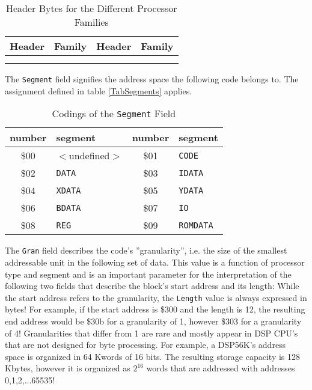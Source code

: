 \documentclass[12pt,twoside]{report}
\newcommand{\tty}[1]{{\tt #1}}
\begin{document}
\begin{center}\begin{longtable}{|c|l||c|l|}
\hline
Header  & Family & Header  & Family \\
\hline
\hline
\endhead

\\ \hline
\caption{Header Bytes for the Different Processor Families}
\label{TabHeader}
\end{longtable}\end{center}

The \tty{Segment} field signifies the address space the following code
belongs to.  The assignment defined in table \ref{TabSegments} applies.
\begin{table*}[htbp]
\begin{center}\begin{tabular}{|c|l||c|l|}
\hline
number  & segment               & number  & segment \\
\hline
\hline
\$00    & $<$undefined$>$       & \$01    & \tty{CODE} \\
\$02    & \tty{DATA}            & \$03    & \tty{IDATA} \\
\$04    & \tty{XDATA}           & \$05    & \tty{YDATA} \\
\$06    & \tty{BDATA}           & \$07    & \tty{IO} \\
\$08    & \tty{REG}             & \$09    & \tty{ROMDATA} \\
\hline
\end{tabular}\end{center}
\caption{Codings of the {\tt Segment} Field\label{TabSegments}
         \label{TabSegmentNums}}
\end{table*}
The \tty{Gran} field describes the code's ''granularity'', i.e. the size of
the smallest addressable unit in the following set of data.  This
value is a function of processor type and segment and is an important
parameter for the interpretation of the following two fields that
describe the block's start address and its length: While the start
address refers to the granularity, the \tty{Length} value is always
expressed in bytes!  For example, if the start address is \$300 and
the length is 12, the resulting end address would be \$30b for a
granularity of 1, however \$303 for a granularity of 4!  Granularities
that differ from 1 are rare and mostly appear in DSP CPU's that are
not designed for byte processing.  For example, a DSP56K's address
space is organized in 64 Kwords of 16 bits.  The resulting storage
capacity is 128 Kbytes, however it is organized as $2^{16}$ words that
are addressed with addresses 0,1,2,...65535!
\end{document}
